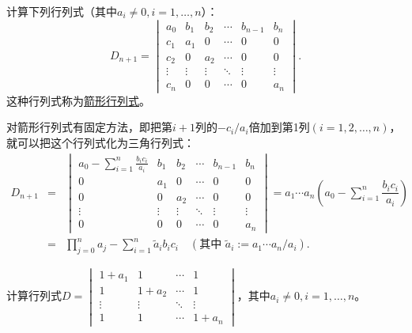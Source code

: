 \begin{eg}
计算下列行列式（其中$a_i \neq 0, i = 1,…, n$）：
$$D_{n+1} = \begin{vmatrix}
a_0 & b_1 & b_2 & \cdots & b_{n-1} & b_n \\ c_1 & a_1 & 0 & \cdots & 0 & 0 \\ c_2 & 0 & a_2 & \cdots & 0 & 0 \\ \vdots & \vdots & \vdots & \ddots & \vdots & \vdots \\ c_n & 0 & 0 & \cdots & 0 & a_n \end{vmatrix}.$$
这种行列式称为\underline{箭形行列式}。
\end{eg}

\begin{solution}
对箭形行列式有固定方法，即把第$i+1$列的$-c_i/a_i$倍加到第1列$(i=1,2,…,n)$，就可以把这个行列式化为三角行列式：
\begin{eqnarray*}
D_{n+1} & = & \begin{vmatrix}
a_0 - \sum\limits_{i=1}^n\frac{b_ic_i}{a_i} & b_1 & b_2 & \cdots & b_{n-1} & b_n \\ 0 & a_1 & 0 & \cdots & 0 & 0 \\ 0 & 0 & a_2 & \cdots & 0 & 0 \\ \vdots & \vdots & \vdots & \ddots & \vdots & \vdots \\ 0 & 0 & 0 & \cdots & 0 & a_n \end{vmatrix} = a_1\cdots a_n\left( a_0 - \sum\limits_{i=1}^n \dfrac{b_ic_i}{a_i} \right) \\
& = & \prod\limits_{j=0}^n a_j - \sum\limits_{i=1}^n \widetilde{a}_ib_ic_i \quad (\text{其中 } \widetilde{a}_i := a_1\cdots a_n / a_i).
\end{eqnarray*}
\end{solution}

\begin{eg}
计算行列式$D = \begin{vmatrix}
1+a_1 & 1 & \cdots & 1 \\ 1 & 1+a_2 & \cdots & 1 \\ \vdots & \vdots & \ddots & \vdots \\ 1 & 1 & \cdots & 1+a_n \end{vmatrix}$，其中$a_i \neq 0, i = 1,…, n$。
\end{eg}

